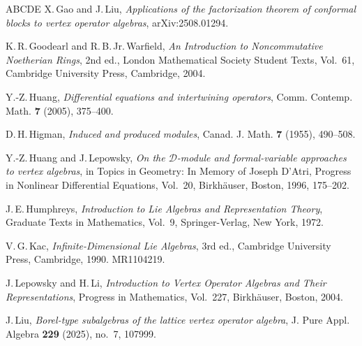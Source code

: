 \documentclass[12pt,a4paper,reqno]{amsart}
\numberwithin{equation}{section}
\numberwithin{equation}{section}
\theoremstyle{definition}
\begin{document}
\begin{thebibliography}{ABCDE}
	X.\,Gao and J.\,Liu,
	{\em Applications of the factorization theorem of conformal blocks to vertex operator algebras},
	arXiv:2508.01294.
	
	K.\,R.\,Goodearl and R.\,B.\,Jr.\,Warfield,
	{\em An Introduction to Noncommutative Noetherian Rings}, 2nd ed.,
	London Mathematical Society Student Texts, Vol.~61,
	Cambridge University Press, Cambridge, 2004.
	
	Y.-Z.\,Huang,
	{\em Differential equations and intertwining operators},
	Comm. Contemp. Math. \textbf{7} (2005), 375--400.
	
	
	D.\,H.\,Higman,
	{\em Induced and produced modules},
	Canad. J. Math. \textbf{7} (1955), 490--508.
	
	Y.-Z.\,Huang and J.\,Lepowsky,
	{\em On the $\mathcal{D}$-module and formal-variable approaches to vertex algebras},
	in Topics in Geometry: In Memory of Joseph D'Atri,
	Progress in Nonlinear Differential Equations, Vol.~20,
	Birkh\"auser, Boston, 1996, 175--202.
	
	J.\,E.\,Humphreys,
	{\em Introduction to Lie Algebras and Representation Theory},
	Graduate Texts in Mathematics, Vol.~9,
	Springer-Verlag, New York, 1972.
	
	
	V.\,G.\,Kac,
	{\em Infinite-Dimensional Lie Algebras}, 3rd ed.,
	Cambridge University Press, Cambridge, 1990. MR1104219.
	
	
	J.\,Lepowsky and H.\,Li,
	{\em Introduction to Vertex Operator Algebras and Their Representations},
	Progress in Mathematics, Vol.~227, Birkh\"auser, Boston, 2004.
	
	J.\,Liu,
	{\em Borel-type subalgebras of the lattice vertex operator algebra},
	J. Pure Appl. Algebra \textbf{229} (2025), no.~7, 107999.
	

\end{thebibliography}
\end{document}
